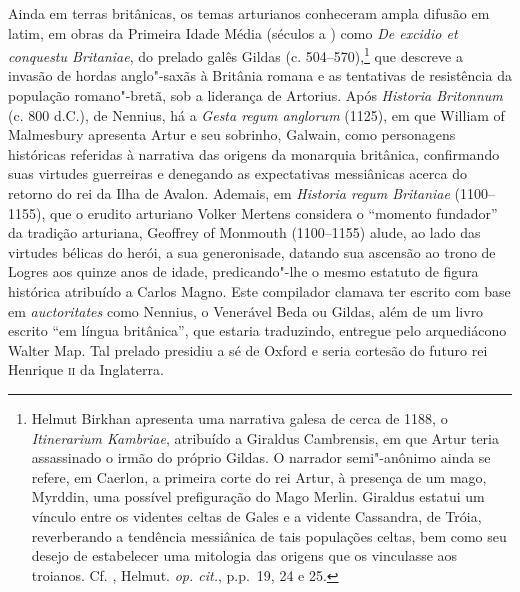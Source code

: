 Ainda em terras britânicas, os temas arturianos conheceram ampla difusão em
latim, em obras da Primeira Idade Média (séculos  a ) como \textit{De
excidio et conquestu Britaniae}, do prelado galês Gildas (c. 504--570),\footnote{
Helmut Birkhan apresenta uma narrativa galesa de cerca de 1188, o
\textit{Itinerarium Kambriae}, atribuído a Giraldus Cambrensis, em que Artur
teria assassinado o irmão do próprio Gildas. O narrador semi"-anônimo ainda se
refere, em Caerlon, a primeira corte do rei Artur, à presença de um mago,
Myrddin, uma possível prefiguração do Mago Merlin. Giraldus estatui um vínculo
entre os videntes celtas de Gales e a vidente Cassandra, de Tróia, reverberando
a tendência messiânica de tais populações celtas, bem como seu desejo de
estabelecer uma mitologia das origens que os vinculasse aos troianos. Cf.
, Helmut. \textit{op. cit.}, p.p.~19, 24 e 25. } que descreve a invasão
de hordas anglo"-saxãs à Britânia romana e as tentativas de resistência da
população romano"-bretã, sob a liderança de Artorius. Após \textit{Historia
Britonnum} (c. 800 d.C.), de Nennius, há a \textit{Gesta regum anglorum }(1125), em
que William of Malmesbury apresenta Artur e seu sobrinho, Galwain, como
personagens históricas referidas à narrativa das origens da monarquia
britânica, confirmando suas virtudes guerreiras e denegando as expectativas
messiânicas acerca do retorno do rei da Ilha de Avalon. Ademais, em
\textit{Historia regum Britaniae }(1100--1155), que o erudito arturiano Volker
Mertens considera o “momento fundador” da tradição arturiana, Geoffrey of
Monmouth (1100--1155) alude, ao lado das virtudes bélicas do herói, a sua generonisade,
datando sua ascensão ao trono de Logres aos quinze anos de idade, predicando"-lhe o
mesmo estatuto de figura histórica atribuído a Carlos Magno. Este compilador
clamava ter escrito com base em \textit{auctoritates} como Nennius, o Venerável
Beda ou Gildas, além de um livro escrito “em língua britânica”, que estaria
traduzindo, entregue pelo arquediácono Walter Map. Tal prelado presidiu a sé de Oxford
e seria cortesão do futuro rei Henrique \textsc{ii} da Inglaterra.


